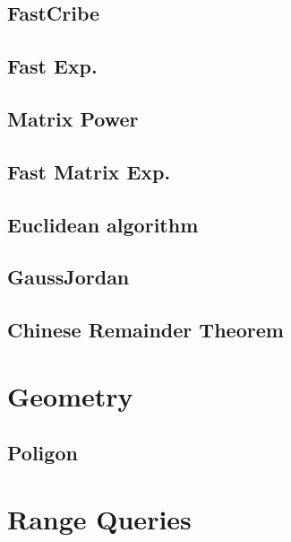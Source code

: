 \subsection{FastCribe}
\raggedbottom
\hrulefill
\subsection{ Fast Exp.}
\raggedbottom
\hrulefill
\subsection{ Matrix Power}
\raggedbottom
\hrulefill
\subsection{ Fast Matrix Exp.}
\raggedbottom
\hrulefill
\subsection{  Euclidean algorithm}
\raggedbottom
\hrulefill
\subsection{  GaussJordan}
\raggedbottom
\hrulefill
\subsection{   Chinese Remainder Theorem}
\raggedbottom
\hrulefill

\section{Geometry}
\subsection{   Poligon}
\raggedbottom
\hrulefill

\section{Range Queries}
